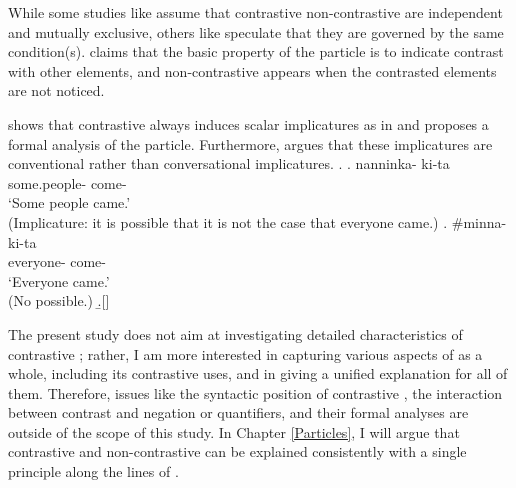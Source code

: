 While some studies like  assume that
contrastive non-contrastive  are independent and mutually exclusive,
others like  speculate that
they are governed by the same condition(s).
claims that the basic property of the particle is to indicate contrast with other elements, and non-contrastive  appears when the contrasted elements are not noticed.



shows that contrastive  always induces scalar implicatures as in \Next[a] and
proposes a formal analysis of the particle.
Furthermore,
 argues that these implicatures
are conventional rather than conversational implicatures.
%
\ex.
 \ag. nanninka- ki-ta \\
      some.people- come- \\
      `Some people came.'\\
      (Implicature: it is possible that it is not the case that
      everyone came.)
  \bg. \#minna- ki-ta \\
        everyone- come- \\
        `Everyone came.'\\
        (No  possible.)
  \b.[] \hfill{\cite[36]{hara06}}


The present study does not aim at investigating detailed characteristics of contrastive ;
rather, I am more interested in capturing various aspects of  as a whole,
including its contrastive uses,
and in giving a unified explanation for all of them.
Therefore, issues like the syntactic position of contrastive ,
the interaction between contrast and negation or quantifiers,
and their formal analyses
are outside of the scope of this study.
In Chapter \ref{Particles},
I will argue that contrastive and non-contrastive  can be explained consistently with a single principle along the lines of .

